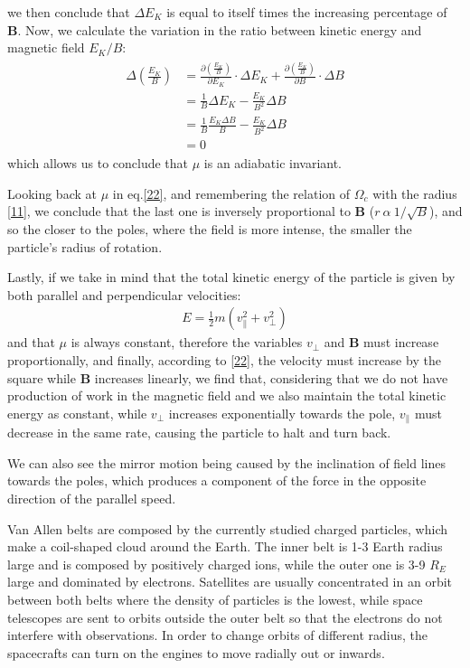 \documentclass[12pt,a4paper]{article}
\begin{document}
we then conclude that $\Delta E_K$ is equal to itself times the increasing percentage of \textbf{B}. Now, we calculate the variation in the ratio between kinetic energy and magnetic field $E_K/B$:
\begin{align}
    \begin{split}
        \Delta(\frac{E_K}{B})&=\frac{\partial(\frac{E_K}{B})}{\partial E_K}\cdot\Delta E_K+\frac{\partial(\frac{E_K}{B})}{\partial B}\cdot\Delta B \\
        &=\frac{1}{B}\Delta E_K-\frac{E_K}{B^2}\Delta B \\
        &=\frac{1}{B}\frac{E_K\Delta B}{B}-\frac{E_K}{B^2}\Delta B \\
        &=0
    \end{split}
\end{align}
which allows us to conclude that $\mu$ is an adiabatic invariant. 

Looking back at $\mu$ in eq.\eqref{22}, and remembering the relation of $\Omega_c$ with the radius \eqref{11}, we conclude that the last one is inversely proportional to \textbf{B} ($r\:\alpha\:1/\sqrt{B}$), and so the closer to the poles, where the field is more intense, the smaller the particle's radius of rotation.

Lastly, if we take in mind that the total kinetic energy of the particle is given by both parallel and perpendicular velocities:
\begin{align}
    E=\frac{1}{2}m(v^2_\|+v^2_\bot)
\end{align}
and that $\mu$ is always constant, therefore the variables $v_\bot$ and \textbf{B} must increase proportionally, and finally, according to \eqref{22}, the velocity must increase by the square while \textbf{B} increases linearly, we find that, considering that we do not have production of work in the magnetic field and we also maintain the total kinetic energy as constant, while $v_\bot$ increases exponentially towards the pole, $v_\|$ must decrease in the same rate, causing the particle to halt and turn back.

We can also see the mirror motion being caused by the inclination of field lines towards the poles, which produces a component of the force in the opposite direction of the parallel speed.

Van Allen belts are composed by the currently studied charged particles, which make a coil-shaped cloud around the Earth. The inner belt is 1-3 Earth radius large and is composed by positively charged ions, while the outer one is 3-9 $R_E$ large and dominated by electrons. Satellites are usually concentrated in an orbit between both belts where the density of particles is the lowest, while space telescopes are sent to orbits outside the outer belt so that the electrons do not interfere with observations. In order to change orbits of different radius, the spacecrafts can turn on the engines to move radially out or inwards.
\end{document}
